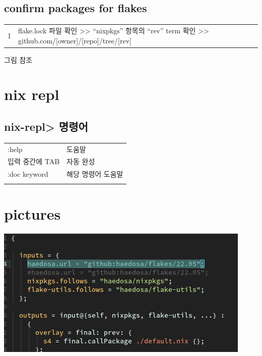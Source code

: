 \documentclass[11pt]{article}
\begin{document}
\subsection{confirm packages for flakes}
\label{sec:org08e56f3}
\begin{center}
\begin{tabular}{rl}
1 & flake.lock 파일 확인 >> ``nixpkgs'' 항목의 ``rev'' term 확인 >> github.com/[owner]/[repo]/tree/[rev]\\
\end{tabular}
\end{center}
그림 참조

\section{nix repl}
\label{sec:org29b84a3}
\subsection{nix-repl> 명령어}
\label{sec:org790f590}
\begin{center}
\begin{tabular}{ll}
:help & 도움말\\
입력 중간에 TAB & 자동 완성\\
:doc keyword & 해당 명령어 도움말\\
 & \\
\end{tabular}
\end{center}

\section{pictures}
\label{sec:org3121d7a}
\begin{center}
\includegraphics[width=.9\linewidth]{./img/3_nix/flake input url.png}
\label{flake input url}
\end{center}
\end{document}
